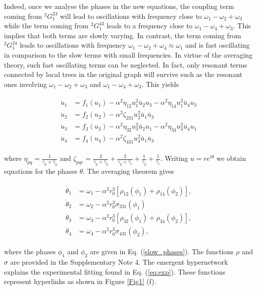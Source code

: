 \documentclass[12pt]{article}
\theoremstyle{plain}
\theoremstyle{definition}
\theoremstyle{remark}
\theoremstyle{remark}
\begin{document}
{\color{black} 
Indeed, once we analyse the phases in the new equations, the coupling term coming from $^2G_1^{23}$ will lead to oscillations with frequency close to $\omega_1 - \omega_2 + \omega_3$ while the term coming from $^2G_1^{43}$ leads to a frequency close to $\omega_1 - \omega_4 + \omega_3$. This implies that both terms are slowly varying. In contrast, the term coming from $^2G_1^{24}$ leads to oscillations with frequency $\omega_1 - \omega_2 + \omega_4 \approx \omega_1$ and is fast oscillating in comparison to the slow terms with small frequencies. In virtue of the averaging theory, such fast oscillating terms can be neglected. In fact, only resonant terms  connected by local trees in the original graph will survive such as the resonant ones involving $\omega_1 - \omega_2+ \omega_3$ and $\omega_1 - \omega_4+ \omega_3$.} This yields  
\begin{linenomath}
\begin{eqnarray}
\begin{split}
\label{hn}
\dot u_1 &= f_1(u_1)
- \alpha^2 \eta_{12} 
u_1^2 \bar u_2 u_3 - \alpha^2  \eta_{14}
u_1^2 \bar u_4 u_3 \label{eqr} \\
\dot u_2 &= f_2( u_2) 
- \alpha^2 \zeta_{231}
 u_2^2 \bar u_1 \bar u_3 \\
\dot u_3 &= f_3(u_3) 
- \alpha^2 \eta_{32}
u_3^2 \bar u_2 u_1 - \alpha^2 \eta_{34}
u_3^2 \bar u_4 u_1 \\
\dot u_4 &= f_4(u_4)
- \alpha^2 \zeta_{431}u_4^2 \bar u_1 \bar u_3 
\end{split}
\end{eqnarray}
\end{linenomath}
\noindent
where
$\eta_{pq} = \frac{1}{\gamma_p + \bar \gamma_q}$
and  $\zeta_{pqr} = \frac{2}{\gamma_p + \bar \gamma_q }
+\frac{2}{\gamma_p + \bar \gamma_r } 
+ \frac{1}{\bar \gamma_q } + \frac{1}{\bar \gamma_r }$.
Writing $u = re^{i\theta}$ we obtain equations for the phases $\theta$.  The averaging theorem  gives
\begin{linenomath}
\begin{eqnarray}\label{EqsPhaseRed}
\begin{split}
\dot \theta_{1} &= \omega_{1} - \alpha^2 r_0^3 \left[ \rho_{12}(\phi_1) + \rho_{14} (\phi_2) \right],  \\
\dot \theta_{2} &= \omega_{2} - \alpha^2 r_0^3    \sigma_{231}(\phi_1)  \\
\dot \theta_{3} &= \omega_{3} - \alpha^2 r_0^3 \left[ \rho_{32}(\phi_1) + \rho_{34} (\phi_2) \right],  \\
\dot \theta_{4} &= \omega_{4} - \alpha^2 r_0^3    \sigma_{431}(\phi_2), 
\end{split}
\end{eqnarray} 
\end{linenomath}
where the phases $\phi_1$ and $\phi_2$ are given in Eq. (\ref{slow_phases}). 
The functions $\rho$ and $\sigma$ are provided in the {Supplementary Note 4}. The emergent hypernetwork explains the experimental fitting found in Eq. (\ref{eq:exp}). These functions represent hyperlinks as shown in Figure \ref{Fig1} (f).
\end{document}
